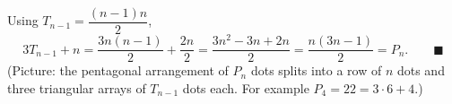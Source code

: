 Using $T_{n-1}=\dfrac{(n-1)n}{2}$,
\[3T_{n-1}+n=\dfrac{3n(n-1)}{2}+\dfrac{2n}{2}=\dfrac{3n^2-3n+2n}{2}=\dfrac{n(3n-1)}{2}=P_n.\qquad\blacksquare\]
(Picture: the pentagonal arrangement of $P_n$ dots splits into a row of $n$ dots and three triangular arrays of $T_{n-1}$ dots each. For example $P_4=22=3\cdot6+4$.)
